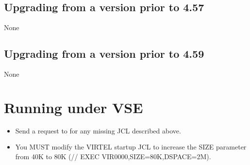 \documentclass[letterpaper,10pt,english]{sphinxmanual}
\begin{document}
\ignorespaces 

\section{Upgrading from a version prior to 4.57}
\label{\detokenize{Migration_Guide:upgrading-from-a-version-prior-to-4-57}}\label{\detokenize{Migration_Guide:index-7}}
None


\section{Upgrading from a version prior to 4.59}
\label{\detokenize{Migration_Guide:upgrading-from-a-version-prior-to-4-59}}
None

\newpage

\ignorespaces 

\chapter{Running under VSE}
\label{\detokenize{Migration_Guide:running-under-vse}}\label{\detokenize{Migration_Guide:index-8}}\begin{itemize}
\item {} 
Send a request to  for any missing JCL described above.

\item {} 
You MUST modify the VIRTEL startup JCL to increase the SIZE parameter from 40K to 80K (// EXEC VIR0000,SIZE=80K,DSPACE=2M).

\end{itemize}

\newpage

\ignorespaces 
\end{document}
